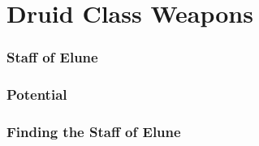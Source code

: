 \section{Druid Class Weapons}

\subsubsection{Staff of Elune}

\subsubsection{Potential}

\subsubsection{Finding the Staff of Elune}